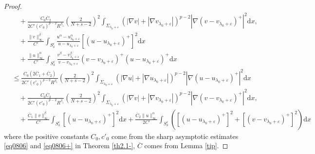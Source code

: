 \documentclass[12pt]{amsart}
\theoremstyle{definition}
\theoremstyle{remark}
\theoremstyle{conclusion}
\theoremstyle{conjecture}
\numberwithin{equation}{section}
\newcommand{\R}{\mathbb{R}}
\begin{document}
\begin{proof}
\begin{align}
&\quad +\frac{C_0 \overline{C}_2}{2C'(c'_0)^{p-2}R^{\beta_1}} \left( \frac{2}{N+s-2} \right)^2  \int_{\Sigma_{\lambda_0 + \varepsilon}}  (|\nabla v|+|\nabla v_{\lambda_0+\varepsilon}|)^{p-2} |\nabla(v-v_{\lambda_0+\varepsilon})^+|^2 \mathrm{d}x,  \nonumber  \\
&\quad + \frac{\|v\|^\beta_{\infty}}{C'} \int_{S^\varepsilon_\delta} \frac{u^\alpha-u^\alpha_{\lambda_0+\varepsilon}}{u-u_{\lambda_0+\varepsilon}}[(u-u_{\lambda_0+\varepsilon})^+]^2  \mathrm{d}x \nonumber \\
& \quad + \frac{\|u\|^\alpha_{\infty}}{C'} \int_{S^\varepsilon_\delta} \frac{v^\beta-v^\beta_{\lambda_0+\varepsilon}}{v-v_{\lambda_0+\varepsilon}}(v-v_{\lambda_0+\varepsilon})^+ (u-u_{\lambda_0+\varepsilon})^+ \mathrm{d}x \nonumber\\
&\leq \frac{C_0(2\overline{C}_1+\overline{C}_2)}{2C'(c'_0)^{p-2}R^{\beta_1}} \left( \frac{2}{N+s-2} \right)^2 \int_{\Sigma_{\lambda_0 + \varepsilon}}\left(|\nabla u| +|\nabla u_{\lambda_0+\varepsilon}|\right)^{p-2} |\nabla(u-u_{\lambda_0+\varepsilon})^+|^2 \mathrm{d}x \nonumber\\
&\quad+\frac{C_0\overline{C}_2}{2C'(c'_0)^{p-2}R^{\beta_1}} \left( \frac{2}{N+s-2} \right)^2  \int_{\Sigma_{\lambda_0 + \varepsilon}}  (|\nabla v|+|\nabla v_{\lambda_0+\varepsilon}|)^{p-2} |\nabla(v-v_{\lambda_0+\varepsilon})^+|^2 \mathrm{d}x,  \nonumber \\
&\quad + \frac{\overline{C}_1\|v\|^\beta_{\infty}}{C'} \int_{S^\varepsilon_\delta}[(u-u_{\lambda_0+\varepsilon})^+]^2 \mathrm{d}x  + \frac{\overline{C}_2\|u\|^\alpha_{\infty}}{2C'} \int_{S^\varepsilon_\delta}\left([(u-u_{\lambda_0+\varepsilon})^+]^2+[(v-v_{\lambda_0+\varepsilon})^+]^2\right) \mathrm{d}x \nonumber
\end{align}
where the positive constants $C_0, c'_0$ come from the sharp asymptotic estimates \eqref{eq0806} and \eqref{eq0806+} in Theorem \ref{th2.1-}, $\overline{C}$ comes from Lemma \ref{tip}.



\end{proof}
\end{document}
